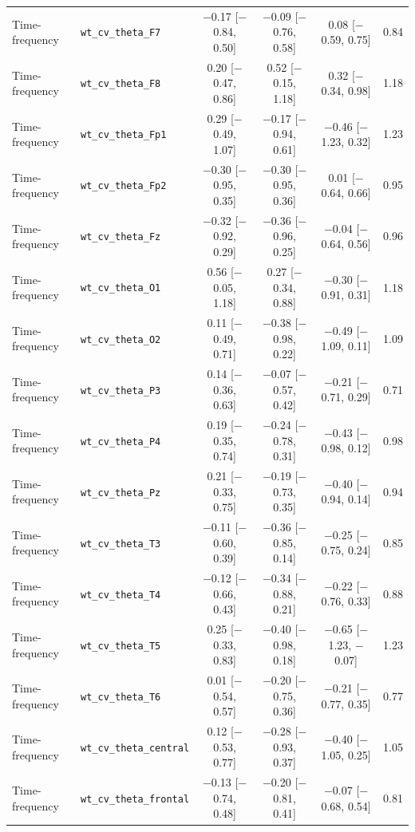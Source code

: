 {\begin{longtable}{llcccc}
Time-frequency & \texttt{wt\_cv\_theta\_F7} & $-$0.17 [$-$0.84, 0.50] & $-$0.09 [$-$0.76, 0.58] & 0.08 [$-$0.59, 0.75] & 0.84 \\
Time-frequency & \texttt{wt\_cv\_theta\_F8} & 0.20 [$-$0.47, 0.86] & 0.52 [$-$0.15, 1.18] & 0.32 [$-$0.34, 0.98] & 1.18 \\
Time-frequency & \texttt{wt\_cv\_theta\_Fp1} & 0.29 [$-$0.49, 1.07] & $-$0.17 [$-$0.94, 0.61] & $-$0.46 [$-$1.23, 0.32] & 1.23 \\
Time-frequency & \texttt{wt\_cv\_theta\_Fp2} & $-$0.30 [$-$0.95, 0.35] & $-$0.30 [$-$0.95, 0.36] & 0.01 [$-$0.64, 0.66] & 0.95 \\
Time-frequency & \texttt{wt\_cv\_theta\_Fz} & $-$0.32 [$-$0.92, 0.29] & $-$0.36 [$-$0.96, 0.25] & $-$0.04 [$-$0.64, 0.56] & 0.96 \\
Time-frequency & \texttt{wt\_cv\_theta\_O1} & 0.56 [$-$0.05, 1.18] & 0.27 [$-$0.34, 0.88] & $-$0.30 [$-$0.91, 0.31] & 1.18 \\
Time-frequency & \texttt{wt\_cv\_theta\_O2} & 0.11 [$-$0.49, 0.71] & $-$0.38 [$-$0.98, 0.22] & $-$0.49 [$-$1.09, 0.11] & 1.09 \\
Time-frequency & \texttt{wt\_cv\_theta\_P3} & 0.14 [$-$0.36, 0.63] & $-$0.07 [$-$0.57, 0.42] & $-$0.21 [$-$0.71, 0.29] & 0.71 \\
Time-frequency & \texttt{wt\_cv\_theta\_P4} & 0.19 [$-$0.35, 0.74] & $-$0.24 [$-$0.78, 0.31] & $-$0.43 [$-$0.98, 0.12] & 0.98 \\
Time-frequency & \texttt{wt\_cv\_theta\_Pz} & 0.21 [$-$0.33, 0.75] & $-$0.19 [$-$0.73, 0.35] & $-$0.40 [$-$0.94, 0.14] & 0.94 \\
Time-frequency & \texttt{wt\_cv\_theta\_T3} & $-$0.11 [$-$0.60, 0.39] & $-$0.36 [$-$0.85, 0.14] & $-$0.25 [$-$0.75, 0.24] & 0.85 \\
Time-frequency & \texttt{wt\_cv\_theta\_T4} & $-$0.12 [$-$0.66, 0.43] & $-$0.34 [$-$0.88, 0.21] & $-$0.22 [$-$0.76, 0.33] & 0.88 \\
Time-frequency & \texttt{wt\_cv\_theta\_T5} & 0.25 [$-$0.33, 0.83] & $-$0.40 [$-$0.98, 0.18] & $-$0.65 [$-$1.23, $-$0.07] & 1.23 \\
Time-frequency & \texttt{wt\_cv\_theta\_T6} & 0.01 [$-$0.54, 0.57] & $-$0.20 [$-$0.75, 0.36] & $-$0.21 [$-$0.77, 0.35] & 0.77 \\
Time-frequency & \texttt{wt\_cv\_theta\_central} & 0.12 [$-$0.53, 0.77] & $-$0.28 [$-$0.93, 0.37] & $-$0.40 [$-$1.05, 0.25] & 1.05 \\
Time-frequency & \texttt{wt\_cv\_theta\_frontal} & $-$0.13 [$-$0.74, 0.48] & $-$0.20 [$-$0.81, 0.41] & $-$0.07 [$-$0.68, 0.54] & 0.81 \\

\end{longtable}}
